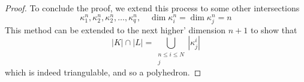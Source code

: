 \documentclass{book}
\begin{document}
\begin{enumerate}[(1)]
\begin{proof}
            \par To conclude the proof, we extend this process to some other intersections 
            \[\kappa^n_1, \kappa^n_2, \kappa^n_2, \dots, \kappa^n_q, \quad \dim \kappa^n_i = \dim \kappa^n_j = n\]
            This method can be extended to the next higher' dimension $n+1$ to show that 
            \[|K| \cap |L| = \bigcup_{\substack{n \leq i \leq N \\ j}} |\kappa^i_j| \]
            which is indeed triangulable, and so a polyhedron. 
        \end{proof}


\end{enumerate}
\end{document}
